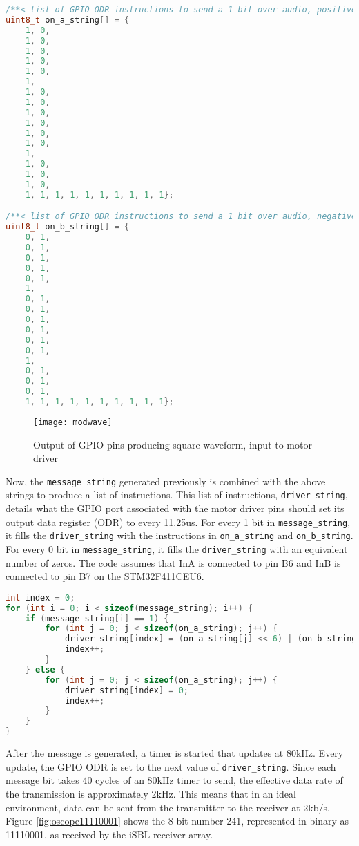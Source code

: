 \documentclass[11pt]{ucthesisCP}
\begin{document}
\begin{lstlisting}[language=C++]
/**< list of GPIO ODR instructions to send a 1 bit over audio, positive input to motor driver */
uint8_t on_a_string[] = {
	1, 0,
	1, 0,
	1, 0,
	1, 0,
	1, 0,
	1,	
	1, 0,
	1, 0,
	1, 0,
	1, 0,
	1, 0,
	1, 0,
	1,
	1, 0,
	1, 0,
	1, 0,
	1, 1, 1, 1, 1, 1, 1, 1, 1, 1};

/**< list of GPIO ODR instructions to send a 1 bit over audio, negative input to motor driver */
uint8_t on_b_string[] = {
	0, 1,
	0, 1,
	0, 1,
	0, 1,
	0, 1,
	1,
	0, 1,
	0, 1,
	0, 1,
	0, 1,
	0, 1,
	0, 1,
	1,
	0, 1,
	0, 1,
	0, 1,
	1, 1, 1, 1, 1, 1, 1, 1, 1, 1};
\end{lstlisting}

\begin{figure}[htbp]
	\centering
	\texttt{[image: modwave]}
	\caption{Output of GPIO pins producing square waveform, input to motor driver}
	\label{fig:modwave}
\end{figure}

Now, the \verb|message_string| generated previously is combined with the above strings to produce a list of instructions. This list of instructions, \verb|driver_string|, details what the GPIO port associated with the motor driver pins should set its output data register (ODR) to every 11.25us. For every 1 bit in \verb|message_string|, it fills the \verb|driver_string| with the instructions in \verb|on_a_string| and \verb|on_b_string|. For every 0 bit in \verb|message_string|, it fills the \verb|driver_string| with an equivalent number of zeros. The code assumes that InA is connected to pin B6 and InB is connected to pin B7 on the STM32F411CEU6.

\begin{lstlisting}[language=C++]
int index = 0;
for (int i = 0; i < sizeof(message_string); i++) {
	if (message_string[i] == 1) {
		for (int j = 0; j < sizeof(on_a_string); j++) {
			driver_string[index] = (on_a_string[j] << 6) | (on_b_string[j] << 7);
			index++;
		}
	} else {
		for (int j = 0; j < sizeof(on_a_string); j++) {
			driver_string[index] = 0;
			index++;
		}
	}
}
\end{lstlisting}

After the message is generated, a timer is started that updates at 80kHz. Every update, the GPIO ODR is set to the next value of \verb|driver_string|. Since each message bit takes 40 cycles of an 80kHz timer to send, the effective data rate of the transmission is approximately 2kHz. This means that in an ideal environment, data can be sent from the transmitter to the receiver at 2kb/s. Figure \ref{fig:oscope11110001} shows the 8-bit number 241, represented in binary as 11110001, as received by the iSBL receiver array.
\end{document}
